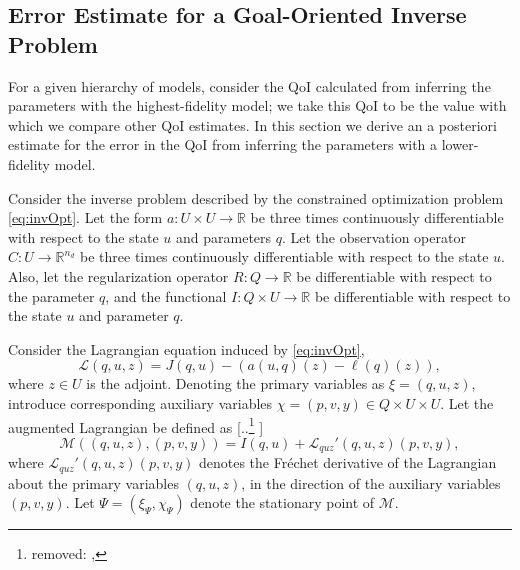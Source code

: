 \documentclass[review]{siamart0516}
\newcommand{\Reals}{{\mathbb{R}}}
\providecommand{\DIFdeltex}[1]{{\protect\color{red} [..\footnote{removed: #1} ]}} %
\providecommand{\DIFaddbegin}{} %
\providecommand{\DIFaddend}{} %
\providecommand{\DIFdelbegin}{} %
\providecommand{\DIFdelend}{} %
\providecommand{\DIFdel}[1]{\texorpdfstring{\DIFdeltex{#1}}{}} %
\newcommand{\DIFscaledelfig}{0.5}
\newlength{\DIFdelgraphicswidth} %
\newlength{\DIFdelgraphicsheight} %
\newcommand{\DIFaddincludegraphics}[2][]{{\color{blue}\fbox{\DIFOincludegraphics[#1]{#2}}}} %
\newcommand{\DIFdelincludegraphics}[2][]{%
\sbox{\DIFdelgraphicsbox}{\DIFOincludegraphics[#1]{#2}}%
\settoboxwidth{\DIFdelgraphicswidth}{\DIFdelgraphicsbox} %
\settoboxtotalheight{\DIFdelgraphicsheight}{\DIFdelgraphicsbox} %
\scalebox{\DIFscaledelfig}{%
\parbox[b]{\DIFdelgraphicswidth}{\usebox{\DIFdelgraphicsbox}\\[-\baselineskip] \rule{\DIFdelgraphicswidth}{0em}}\llap{\resizebox{\DIFdelgraphicswidth}{\DIFdelgraphicsheight}{%
\setlength{\unitlength}{\DIFdelgraphicswidth}%
\begin{picture}(1,1)%
\thicklines\linethickness{2pt} %
{\color[rgb]{1,0,0}\put(0,0){\framebox(1,1){}}}%
{\color[rgb]{1,0,0}\put(0,0){\line( 1,1){1}}}%
{\color[rgb]{1,0,0}\put(0,1){\line(1,-1){1}}}%
\end{picture}%
}\hspace*{3pt}}} %
} %
\DeclareRobustCommand{\DIFaddbegin}{\DIFOaddbegin \let\includegraphics\DIFaddincludegraphics} %
\DeclareRobustCommand{\DIFaddend}{\DIFOaddend \let\includegraphics\DIFOincludegraphics} %
\DeclareRobustCommand{\DIFdelbegin}{\DIFOdelbegin \let\includegraphics\DIFdelincludegraphics} %
\DeclareRobustCommand{\DIFdelend}{\DIFOaddend \let\includegraphics\DIFOincludegraphics} %
\begin{document}
\subsection[Error Estimate for a Goal-Oriented Inverse Problem]{Error Estimate for a Goal-Oriented Inverse Problem}  \label{sec:deriv}
%
For a given hierarchy of models, consider the QoI calculated from inferring the parameters with the highest-fidelity model; we take this QoI to be the value with which we compare other QoI estimates. In this section we derive an a posteriori estimate for the error in the QoI from inferring the parameters with a lower-fidelity model.
%
\DIFdelbegin %
\DIFdelend \DIFaddbegin \begin{proposition}
\DIFaddend \label{thm:error_estimate}
Consider the inverse problem described by the constrained optimization problem \cref{eq:invOpt}. Let the form $a:U \times U \to \Reals$ be three times continuously differentiable with respect to the state $u$ and parameters $q$. Let the observation operator $C:U\to\Reals^{n_d}$ be three times continuously differentiable with respect to the state $u$. Also, let the regularization operator $R:Q\to\Reals$ be differentiable with respect to the parameter $q$, and the functional $I:Q\times U\to\Reals$ be differentiable with respect to the state $u$ and parameter $q$.

Consider the Lagrangian equation induced by \cref{eq:invOpt},
%
\begin{equation}
\label{eq:InvsOpt_lag}
\mathcal{L}(q,u,z)= J(q,u)-(a(u,q)(z)-\ell(q)(z)),
\end{equation}
%
where $z\in U$ is the adjoint. Denoting the primary variables as $\xi=(q,u,z)$, introduce corresponding auxiliary variables $\chi=(p,v,y)\in Q\times U\times U$. Let the augmented Lagrangian be defined as
\DIFdelbegin \DIFdel{,
}\DIFdelend %
\begin{equation}
\label{eq:InvsOpt_auglag}
\mathcal{M}((q,u,z),(p,v,y)) = I(q,u) + \mathcal{L}_{quz}'(q,u,z)(p,v,y),
\end{equation}
%
where $\mathcal{L}_{quz}'(q,u,z)(p,v,y)$ denotes the Fr\'{e}chet derivative of the Lagrangian about the primary variables $(q,u,z)$, in the direction of the auxiliary variables $(p,v,y)$. Let $\Psi = (\xi_\Psi,\chi_\Psi)$ denote the stationary point of $\mathcal{M}$.


\end{proposition}
\end{document}
